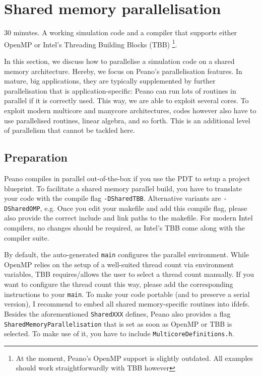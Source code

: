 \section{Shared memory parallelisation}


\chapterDescription
  {
    30 minutes.
  }
  {
    A working simulation code and a compiler that supports either OpenMP or
    Intel's Threading Building Blocks (TBB) \footnote{At the moment, Peano's
    OpenMP support is slightly outdated. All examples should work straightforwardly
    with TBB however}.
  }

In this section, we discuss how to parallelise a simulation code on a shared
memory architecture.
Hereby, we focus on Peano's parallelisation features. 
In mature, big applications, they are typically supplemented by further
parallelisation that is application-specific: Peano can run lots of routines in
parallel if it is correctly used. 
This way, we are able to exploit several cores.
To exploit modern multicore and manycore architectures, codes however also have
to use parallelised routines, linear algebra, and so forth.
This is an additional level of parallelism that cannot be tackled here.

\subsection{Preparation}

Peano compiles in parallel out-of-the-box if you use the PDT to setup a project
blueprint. 
To facilitate a shared memory parallel build, you have to translate your code
with the compile flag \texttt{-DSharedTBB}. 
Alternative variants are \texttt{-DSharedOMP}, e.g.
Once you edit your makefile and add this compile flag, please also provide the
correct include and link paths to the makefile.
For modern Intel compilers, no changes should be required, as Intel's TBB come
along with the compiler suite.

By default, the auto-generated \texttt{main} configures the parallel environment. 
While OpenMP relies on the setup of a well-suited thread count via environment
variables, TBB requires/allows the user to select a thread count manually. 
If you want to configure the thread count this way, please add the corresponding
instructions to your \texttt{main}.
To make your code portable (and to preserve a serial version), I recommend to
embed all shared memory-specific routines into ifdefs.
Besides the aforementioned \texttt{SharedXXX} defines, Peano also provides a
flag \texttt{SharedMemoryParallelisation} that is set as soon as OpenMP or TBB
is selected.
To make use of it, you have to include \texttt{MulticoreDefinitions.h}.

